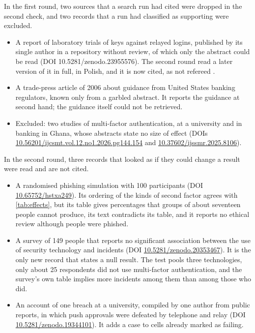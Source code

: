 In the first round, two sources that a search run had cited were dropped
in the second check, and two records that a run had classified as
supporting were excluded.
\begin{itemize}
  \item A report of laboratory trials of keys against relayed logins,
    published by its single author in a repository without review, of
    which only the abstract could be read (DOI 10.5281/zenodo.23955576).
    The second round read a later version of it in full, in Polish, and
    it is now cited, as not refereed
    \autocite{Wasser2026Resilience}.
  \item A trade-press article of 2006 about guidance from United States
    banking regulators, known only from a garbled abstract.
    It reports the guidance at second hand; the guidance itself could
    not be retrieved.
  \item Excluded: two studies of multi-factor authentication, at a
    university and in banking in Ghana, whose abstracts state no size of
    effect (DOIs \url{10.56201/ijcsmt.vol.12.no1.2026.pg144.154} and
    \url{10.37602/ijssmr.2025.8106}).
\end{itemize}
In the second round, three records that looked as if they could change
a result were read and are not cited.
\begin{itemize}
  \item A randomised phishing simulation with 100 participants
    (DOI \url{10.65752/hstxa249}).
    Its ordering of the kinds of second factor agrees with
    \cref{tab:effects}, but its table gives percentages that groups of
    about seventeen people cannot produce, its text contradicts its
    table, and it reports no ethical review although people were
    phished.
  \item A survey of 149 people that reports no significant association
    between the use of security technology and incidents
    (DOI \url{10.5281/zenodo.20353467}).
    It is the only new record that states a null result.
    The test pools three technologies, only about 25 respondents did
    not use multi-factor authentication, and the survey's own table
    implies more incidents among them than among those who did.
  \item An account of one breach at a university, compiled by one
    author from public reports, in which push approvals were defeated by
    telephone and relay (DOI \url{10.5281/zenodo.19344101}).
    It adds a case to cells already marked as failing.
\end{itemize}
